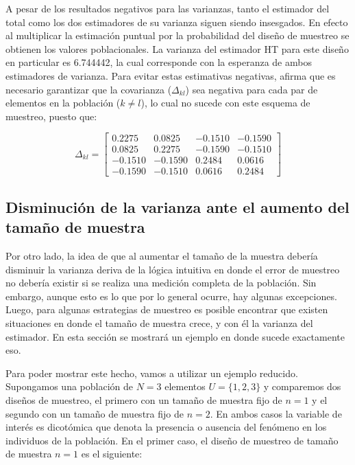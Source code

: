 \documentclass[
  12pt,
]{book}
\begin{document}
A pesar de los resultados negativos para las varianzas, tanto el estimador del total como los dos estimadores de su varianza siguen siendo insesgados. En efecto al multiplicar la estimación puntual por la probabilidad del diseño de muestreo se obtienen los valores poblacionales. La varianza del estimador HT para este diseño en particular es 6.744442, la cual corresponde con la esperanza de ambos estimadores de varianza. Para evitar estas estimativas negativas, \citet{Gutierrez_2016} afirma que es necesario garantizar que la covarianza (\(\Delta_{kl}\)) sea negativa para cada par de elementos en la población (\(k \neq l\)), lo cual no sucede con este esquema de muestreo, puesto que:

\[
\Delta_{kl} =
\begin{bmatrix}
0.2275  & 0.0825  & -0.1510 & -0.1590 \\
0.0825  & 0.2275  & -0.1590 & -0.1510 \\
-0.1510 & -0.1590 & 0.2484  & 0.0616 \\
-0.1590 & -0.1510 & 0.0616  &  0.2484
\end{bmatrix}
\]

\hypertarget{disminuciuxf3n-de-la-varianza-ante-el-aumento-del-tamauxf1o-de-muestra}{%
\subsection{Disminución de la varianza ante el aumento del tamaño de muestra}\label{disminuciuxf3n-de-la-varianza-ante-el-aumento-del-tamauxf1o-de-muestra}}

Por otro lado, la idea de que al aumentar el tamaño de la muestra debería disminuir la varianza deriva de la lógica intuitiva en donde el error de muestreo no debería existir si se realiza una medición completa de la población. Sin embargo, aunque esto es lo que por lo general ocurre, hay algunas excepciones. Luego, para algunas estrategias de muestreo es posible encontrar que existen situaciones en donde el tamaño de muestra crece, y con él la varianza del estimador. En esta sección se mostrará un ejemplo en donde sucede exactamente eso.

Para poder mostrar este hecho, vamos a utilizar un ejemplo reducido. Supongamos una población de \(N = 3\) elementos \(U=\{1, 2, 3\}\) y comparemos dos diseños de muestreo, el primero con un tamaño de muestra fijo de \(n=1\) y el segundo con un tamaño de muestra fijo de \(n=2\). En ambos casos la variable de interés es dicotómica que denota la presencia o ausencia del fenómeno en los individuos de la población. En el primer caso, el diseño de muestreo de tamaño de muestra \(n=1\) es el siguiente:
\end{document}
